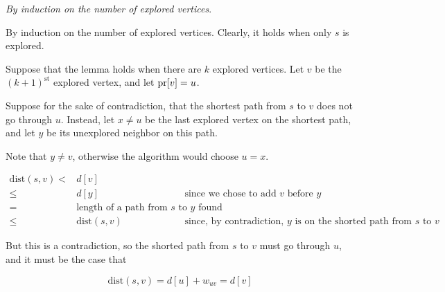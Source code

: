 \documentclass[12pt]{article}
\begin{document}
  {
    {\it By induction on the number of explored vertices}.

    By induction on the number of explored vertices. Clearly, it holds when only
    $s$ is explored.

    Suppose that the lemma holds when there are $k$ explored vertices. Let $v$
    be the $(k + 1)^{\text{st}}$ explored vertex, and let $\text{pr}[v] = u$.

    Suppose for the sake of contradiction, that the shortest path from $s$ to
    $v$ does not go through $u$. Instead, let $x \ne u$ be the last explored
    vertex on the shortest path, and let $y$ be its unexplored neighbor on this
    path.

    Note that $y \ne v$, otherwise the algorithm would choose $u = x$.

    \begin{align*}
      \text{dist}(s, v) <&d[v] \\
                      \le&d[y]          &\text{since we chose to add $v$ before $y$} \\
                      =&\text{length of a path from $s$ to $y$ found} & \\
                    \le&\text{dist}(s, v) &\text{since, by contradiction, $y$ is on the shorted path from $s$ to $v$} \end{align*}

    But this is a contradiction, so the shorted path from $s$ to $v$ must go through
    $u$, and it must be the case that

    \[
      \text{dist}(s, v) = d[u] + w_{uv} = d[v]
    \]
  }


\end{document}
